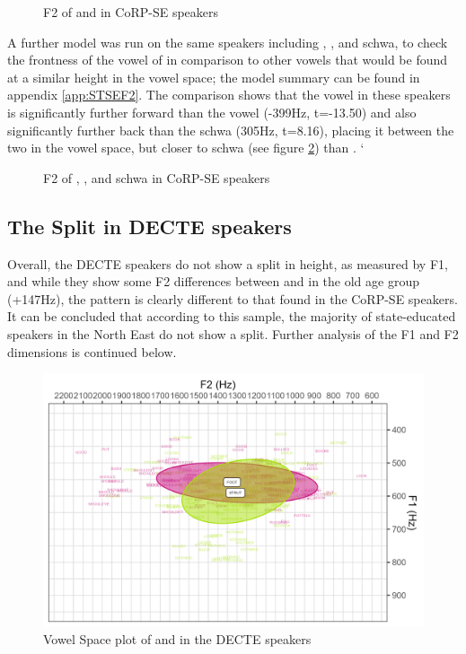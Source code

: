\documentclass[../../../00.FullDoc/tex/ThesisSkeleton-draft2]{subfiles}
\begin{document}
\begin{figure}[h]
	
	\caption{F2 of \foot{} and \strutt{} in CoRP-SE speakers} \label{fig:FSF2SE}
\end{figure}

A further model was run on the same speakers including \strutt{}, , and schwa, to check the frontness of the \strutt{} vowel of in comparison to other vowels that would be found at a similar height in the vowel space; the model summary can be found in appendix \ref{app:STSEF2}. The comparison shows that the \strutt{} vowel in these speakers is significantly further forward than the  vowel (-399Hz, t=-13.50) and also significantly further back than the schwa (305Hz, t=8.16), placing it between the two in the vowel space, but closer to schwa (see figure \ref{fig:STF2SE}) than .
`
\begin{figure}[h]
	
	\caption{F2 of \strutt{}, , and schwa in CoRP-SE speakers} \label{fig:STF2SE}
\end{figure}



\subsection{The  Split in DECTE speakers}
Overall, the DECTE speakers do not show a split in height, as measured by F1, and while they show some F2 differences between \foot{} and \strutt{} in the old age group (+147Hz), the pattern is clearly different to that found in the CoRP-SE speakers. It can be concluded that according to this sample, the majority of state-educated speakers in the North East do not show a \FS{} split. Further analysis of the F1 and F2 dimensions is continued below.

\begin{figure}[h]
	\centering
	\includegraphics[width=\textwidth]{../figures/FS-DE-vplot.png}
	\caption{Vowel Space plot of \foot{} and \strutt{} in the DECTE speakers} \label{fig:FSvplotDE}
\end{figure}
\end{document}
